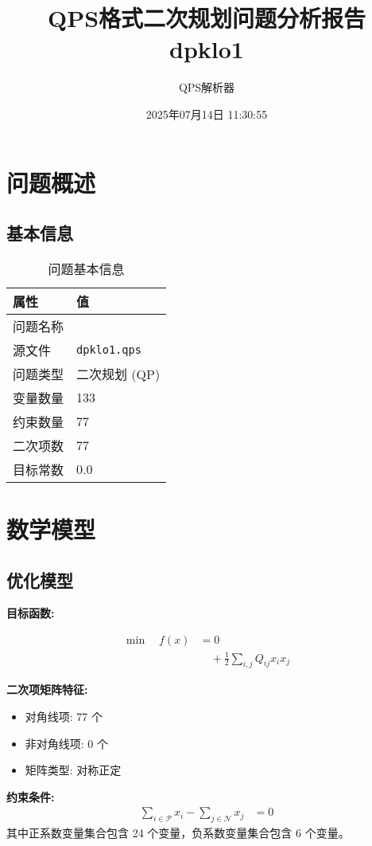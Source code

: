 \documentclass[a4paper,11pt]{article}
\title{QPS格式二次规划问题分析报告\\{\large dpklo1}}
\author{QPS解析器}
\date{2025年07月14日 11:30:55}
\begin{document}
\maketitle
\tableofcontents
\newpage

\section{问题概述}
\subsection{基本信息}
\begin{table}[h!]
\centering
\begin{tabular}{ll}
\toprule
\textbf{属性} & \textbf{值} \\
\midrule
问题名称 & \texttt{} \\
源文件 & \texttt{dpklo1.qps} \\
问题类型 & 二次规划 (QP) \\
变量数量 & 133 \\
约束数量 & 77 \\
二次项数 & 77 \\
目标常数 & 0.0 \\
\bottomrule
\end{tabular}
\caption{问题基本信息}
\end{table}

\section{数学模型}
\subsection{优化模型}

\textbf{目标函数:}

\begin{align}
\min\quad f(x) &= 0 \nonumber\\
&\quad + \frac{1}{2} \sum_{i,j} Q_{ij} x_i x_j\label{eq:objective}
\end{align}

\textbf{二次项矩阵特征:}
\begin{itemize}
\item 对角线项: 77 个
\item 非对角线项: 0 个
\item 矩阵类型: 对称正定
\end{itemize}

\textbf{约束条件:}
\begin{align}
\sum_{i \in \mathcal{P}} x_i - \sum_{j \in \mathcal{N}} x_j &= 0 \nonumber
\end{align}
其中正系数变量集合包含 24 个变量，负系数变量集合包含 6 个变量。\\[0.3em]
\end{document}
